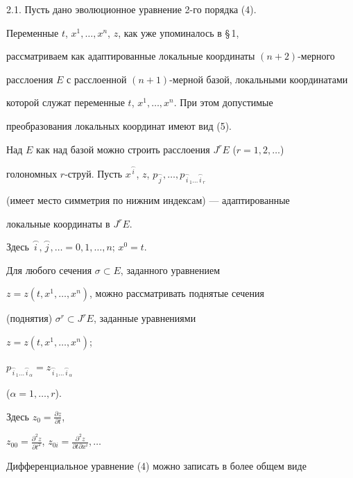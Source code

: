 2.1. Пусть дано эволюционное уравнение 2-го порядка (4). 


Переменные $t$, $x^1, \dotsc,x^n$, $z$, как уже упоминалось в \S\,1, 


рассматриваем как адаптированные локальные координаты $ ({n+2})$-мерного


расслоения $E$ с расслоенной $(n+1)$-мерной базой, локальными координатами 


которой служат переменные $t$, $x^1, \dotsc,x^n$. При этом допустимые 


преобразования локальных координат имеют вид (5).





Над $E$ как над базой можно строить расслоения $J^r E$ ($r=1,2, \dotsc$)


голономных $r$-струй. Пусть $x^{\overset{\frown}


{i}{}}$, $z$, $p_{\overset{\frown}{j}{}}, \dotsc,


p_{ \overset{\frown}{i}{}_1 \dotsc \overset{\frown}{i}{}_r }$


(имеет место симметрия по нижним индексам) --- адаптированные 


локальные координаты в $J^r E$.


Здесь $\overset{\frown}{i}{},


\overset{\frown}{j}{},


\dotsc=0,1,\dotsc,n$; $x^0=t$.


Для любого сечения $\sigma \subset E$, заданного уравнением


$z=z ({t,x^1, \dotsc,x^n})$, можно рассматривать поднятые сечения


(поднятия) $\sigma^r \subset J^rE$, заданные уравнениями


$z=z ({t,x^1, \dotsc,x^n})$;


$p_{ \overset{\frown}{i}{}_1 \dotsc\overset{\frown}{i}{}_\alpha}=


z_{\overset{\frown}{i}{}_1 \dotsc\overset{\frown}{i}{}_\alpha}$


(${\alpha=1, \dotsc,r}$).


Здесь $z_0=\frac{{\partial z}}{{\partial t}}$,


$z_{00}=\frac{{\partial^2 z}}{{\partial t^2}}$, $z_{0i}


=\frac{{\partial^2 z}}{{\partial t\partial x^i}}, \dotsc$





Дифференциальное уравнение (4) можно записать в более общем виде


